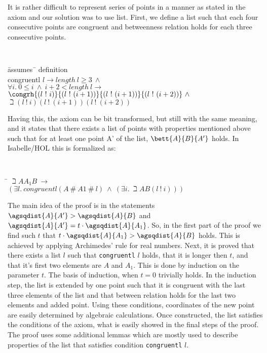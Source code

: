 It is rather difficult to represent series of points in a manner as
stated in the axiom and our solution was to use list. First, we
define a list such that each four consecutive points are congruent
and betweenness relation holds for each three consecutive points.

{\tt
\begin{tabbing}
\hspace{5mm}\=assumes\ \=\kill
definition \\
\> congruentl $l \longrightarrow length\ l \ge 3\ \wedge$\\
\>\>  $\forall i.\ 0 \le i\ \wedge\ i+2 < length\ l \longrightarrow$ \\
\>\>  $\congrh{(l\ !\ i)}{(l\ !\ (i+1))}{(l\ !\ (i+1))}{(l\ !\ (i+2))}\ \wedge $\\
\>\>  $\beth{(l\ !\ i)}{(l\ !\ (i+1))}{(l\ !\ (i+2))}$
\end{tabbing}
}

Having this, the axiom can be bit transformed, but still with the same
meaning, and it states that there exists a list of points with
properties mentioned above such that for at least one point A' of the
list, $\bett{A}{B}{A'}$ holds. In Isabelle/HOL this is formalized as:

{\tt
\begin{tabbing}
\hspace{5mm}\=\kill
$\beth{A}{A_1}{B}\ \longrightarrow$\\
\> $(\exists l.\ congruentl (A\ \#\ A1\ \#\ l)\ \wedge\ (\exists i.\ \beth{A}{B}{(l\ !\ i)}))$
\end{tabbing}
}

The main idea of the proof is in the statements $\agsqdist{A}{A'} >
\agsqdist{A}{B}$ and $\agsqdist{A}{A'} = t\cdot
\agsqdist{A}{A_1}$. So, in the first part of the proof we find such
$t$ that $t\cdot \agsqdist{A}{A_1} > \agsqdist{A}{B}$ holds. This is
achieved by applying Archimedes' rule for real numbers. Next, it is
proved that there exists a list $l$ such that \verb|congruentl| $l$
holds, that it is longer then $t$, and that it's first two elements
are $A$ and $A_1$. This is done by induction on the parameter $t$. The
basis of induction, when $t = 0$ trivially holds. In the induction
step, the list is extended by one point such that it is congruent with
the last three elements of the list and that between relation holds
for the last two elements and added point. Using these conditions,
coordinates of the new point are easily determined by algebraic
calculations. Once constructed, the list satisfies the conditions of
the axiom, what is easily showed in the final steps of the proof. The
proof uses some additional lemmas which are mostly used to describe
properties of the list that satisfies condition \verb|congruentl| $l$.

